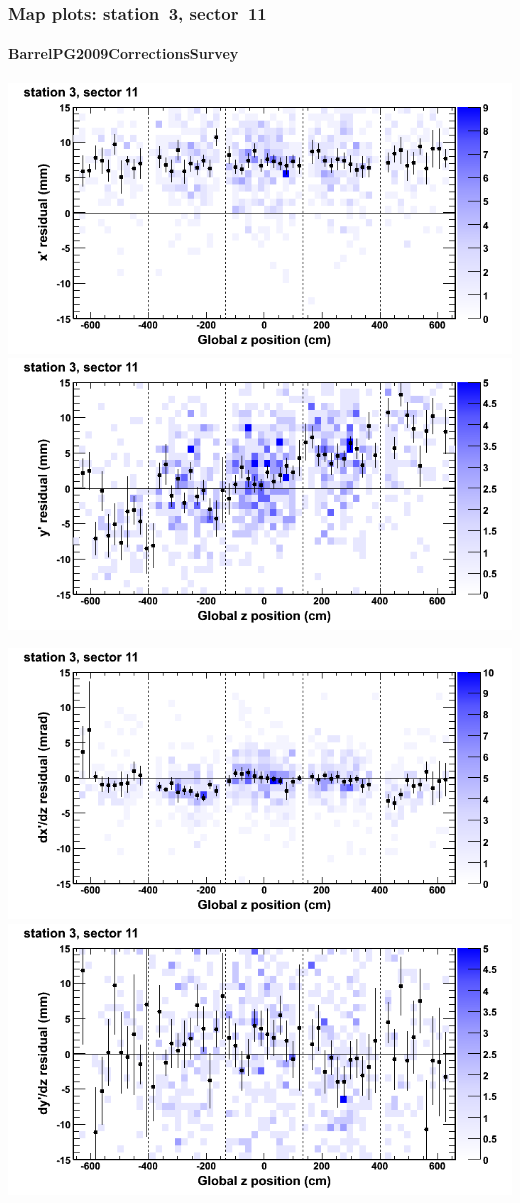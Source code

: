 \documentclass[compress]{beamer}
\begin{document}
\begin{frame}
\frametitle{Map plots: station~3, sector~11}
\framesubtitle{BarrelPG2009CorrectionsSurvey}
\includegraphics[width=0.5\linewidth]{mapplots_01/DTvsz_st3sec11_x.png}
\includegraphics[width=0.5\linewidth]{mapplots_01/DTvsz_st3sec11_y.png}

\includegraphics[width=0.5\linewidth]{mapplots_01/DTvsz_st3sec11_dxdz.png}
\includegraphics[width=0.5\linewidth]{mapplots_01/DTvsz_st3sec11_dydz.png}
\end{frame}
\end{document}
